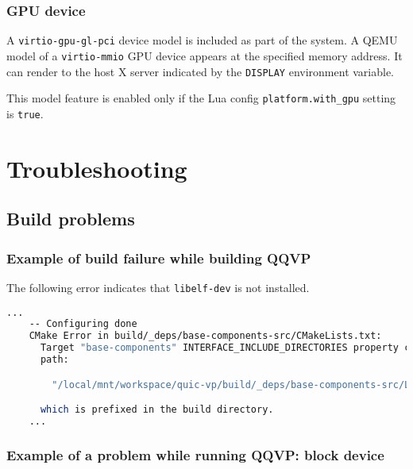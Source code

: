 \subsection{GPU device}

A {\small{\lstinline!virtio-gpu-gl-pci!}} device model is included as part
of the system. A QEMU model of a {\small{\lstinline!virtio-mmio!}} GPU
device appears at the specified memory address.  It can render to the host
X server indicated by the {\small{\lstinline!DISPLAY!}} environment variable.

This model feature is enabled only if the Lua config
{\small{\lstinline!platform.with_gpu!}} setting is {\small{\lstinline!true!}}.

\chapter{Troubleshooting}

\section{Build problems}

\subsection{Example of build failure while building QQVP}

The following error indicates that {\small{\lstinline!libelf-dev!}} is not installed.

\small
\begin{lstlisting}[language=bash]
    ...
    -- Configuring done
    CMake Error in build/_deps/base-components-src/CMakeLists.txt:
      Target "base-components" INTERFACE_INCLUDE_DIRECTORIES property contains
      path:

        "/local/mnt/workspace/quic-vp/build/_deps/base-components-src/LIBELF_INCLUDE_DIRS-NOTFOUND"

      which is prefixed in the build directory.
    ...
\end{lstlisting}
\normalsize


\subsection{Example of a problem while running QQVP: block device}

